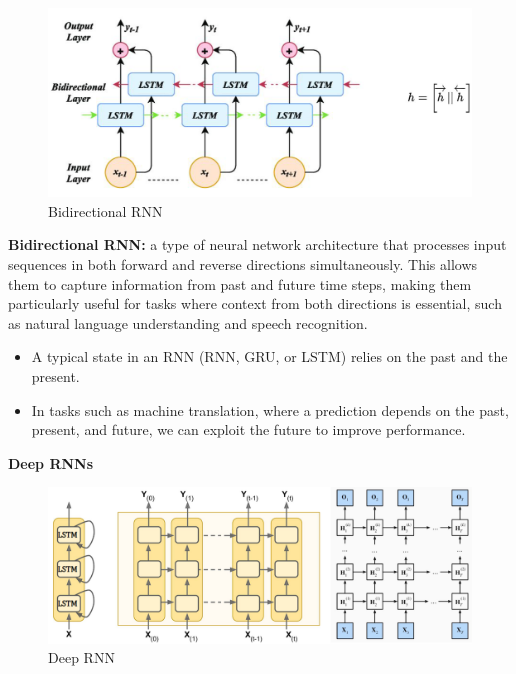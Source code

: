 \begin{figure}[h!t]
    \centering
    \includegraphics[width=0.8\linewidth]{bidirectional.png}
    \caption{Bidirectional RNN}
    \label{fig:enter-label}
\end{figure}

\begin{definition}
    \textbf{Bidirectional RNN:} a type of neural network architecture that processes input sequences in both forward and reverse directions simultaneously. This allows them to capture information from past and future time steps, making them particularly useful for tasks where context from both directions is essential, such as natural language understanding and speech recognition.
\end{definition}

\begin{itemize}
    \item A typical state in an RNN (RNN, GRU, or LSTM) relies on the past and the present.
    \item In tasks such as machine translation, where a prediction depends on the past,
present, and future, we can exploit the future to improve performance.

\end{itemize}

\newpage

\textbf{Deep RNNs}

\begin{figure}[h!t]
    \centering
    \includegraphics[width=0.8\linewidth]{deeprnn.png}
    \caption{Deep RNN}
    \label{fig:enter-label}
\end{figure}

